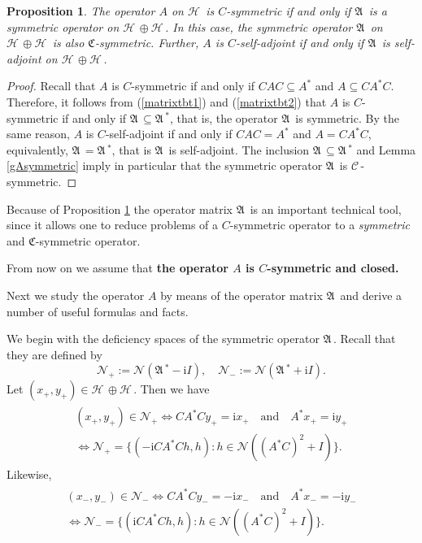 \documentclass[12pt]{amsart}
\newcommand{\ii}{\mathrm{i}}
\newtheorem{prop}[thm]{Proposition}
\theoremstyle{definition}
\newcommand{\cC}{\mathcal{C}\,}
\newcommand{\gA}{\mathfrak{A}\,}
\newcommand{\cH}{\mathcal{H}\,}
\newcommand{\cN}{\mathcal{N}}
\newcommand{\gC}{\mathfrak{C}}
\begin{document}
\begin{prop}\label{opermatrix} The operator $A$ on $\cH$ is $C$-symmetric if and only if $\gA$ is a symmetric operator on $\cH\oplus \cH$. In this case, the symmetric operator $\gA$ on $\cH\oplus\cH$ is also $\gC$-symmetric. Further, $A$ is $C$-self-adjoint if and only if $\gA$ is self-adjoint on $\cH\oplus \cH$.
\end{prop}
\begin{proof}
Recall that  $A$ is $C$-symmetric if and only if $CAC\subseteq A^*$ and $A\subseteq CA^*C.$ Therefore, it follows from (\ref{matrixtbt1}) and (\ref{matrixtbt2}) that  $A$ is $C$-symmetric if and only if $\gA\subseteq  \gA^*$, that is, the operator $\gA$ is symmetric. By the same reason, $A$ is $C$-self-adjoint if and only if $CAC=A^*$ and  $A=CA^*C$, equivalently, $\gA=\gA^*$, that is $\gA$ is self-adjoint. The inclusion $\gA\subseteq \gA^*$ and Lemma \ref{gAsymmetric} imply in particular that the symmetric operator $\gA$ is $\cC$-symmetric.
\end{proof}

Because of Proposition \ref{opermatrix} the operator matrix $\gA$ is an important technical tool, since it allows one to reduce problems of a $C$-symmetric operator to a {\it symmetric} and $\gC$-symmetric operator.

From now on we assume that {\bf  the operator $A$ is $C$-symmetric and closed.}

Next we  study the operator $A$ by means of the operator matrix $\gA$ and derive a number of useful formulas and facts.

We begin with the deficiency spaces of the symmetric operator $\gA$. Recall that they  are defined by
$$\cN_+:=\cN(\gA^*-\ii I),\quad \cN_-:=\cN(\gA^*+\ii I).
$$
Let $(x_+,y_+)\in \cH\oplus \cH$. Then we have %
\begin{align}\label{cher20a}
\begin{array}{l}
(x_+,y_+)\in \cN_+ \Longleftrightarrow CA^*Cy_+=\ii x_+ \quad \textrm{and} \quad A^*x_+=\ii y_+\\[2mm]
\Longleftrightarrow \cN_+=\{(-\ii CA^*C h, h):h\in\cN((A^*C)^2+I)\}.
\end{array}
\end{align}
Likewise,
\begin{align}\label{cher20ab}
\begin{array}{l}
(x_-,y_-)\in \cN_-\Longleftrightarrow CA^*Cy_- =-\ii x_- \quad \textrm{and} \quad A^*x_-=-\ii y_-\\[2mm]
\Longleftrightarrow \cN_-=\{(\ii CA^*C h, h):h\in\cN((A^*C)^2+I)\}.
\end{array}
\end{align}
\end{document}
